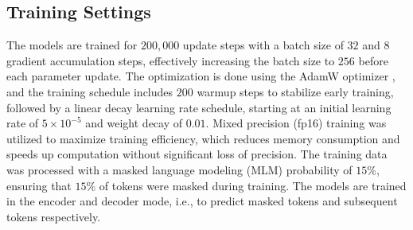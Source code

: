 \subsection{Training Settings}\label{sec:exp_bertmodels_training}
The models are trained for $200,000$ update steps with a batch size of $32$ and $8$ gradient accumulation steps, effectively increasing the batch size to $256$ before each parameter update. The optimization is done using the AdamW optimizer \citep{Loshchilov_Hutter_2019}, and the training schedule includes $200$ warmup steps to stabilize early training, followed by a linear decay learning rate schedule, starting at an initial learning rate of $5 \times 10^{-5}$ and weight decay of $0.01$.
Mixed precision (fp16) training was utilized to maximize training efficiency, which reduces memory consumption and speeds up computation without significant loss of precision. The training data was processed with a masked language modeling (MLM) probability of $15$\%, ensuring that $15$\% of tokens were masked during training.
The models are trained in the encoder and decoder mode, i.e., to predict masked tokens and subsequent tokens respectively.



